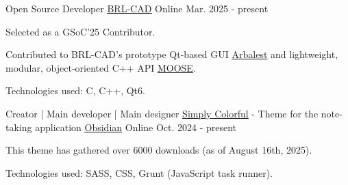 



\begin{cventries}
  \cventry
    {Open Source Developer} %
    {\underline{\href{https://github.com/BRL-CAD/brlcad}{BRL-CAD}}} %
    {Online} %
    {Mar. 2025 - present} %
    {
      \begin{cvitems} %
        \item {Selected as a GSoC'25 Contributor.}
        \item {Contributed to BRL-CAD's prototype Qt-based GUI \underline{\href{https://github.com/BRL-CAD/arbalest}{Arbalest}} and lightweight, modular, object‑oriented C++ API \underline{\href{https://github.com/BRL-CAD/MOOSE}{MOOSE}}.}
        \item {Technologies used: C, C++, Qt6.}
      \end{cvitems}
    }

\end{cventries}




\begin{cventries}
  \cventry
    {Creator | Main developer | Main designer} %
    {\underline{\href{https://github.com/LorenzoPegorari/SimplyColorful}{Simply Colorful}} - Theme for the note-taking application \underline{\href{https://obsidian.md}{Obsidian}}} %
    {Online} %
    {Oct. 2024 - present} %
    {
      \begin{cvitems} %
        \item {This theme has gathered over 6000 downloads (as of August 16th, 2025).}
        \item {Technologies used: SASS, CSS, Grunt (JavaScript task runner).}
      \end{cvitems}
    }

\end{cventries}
